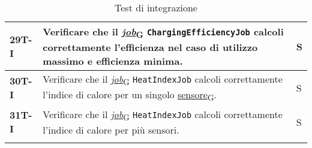 \begin{longtable}{|>{\raggedright\arraybackslash}m{}|>{\raggedright\arraybackslash}m{}|>{\raggedright\arraybackslash}m{}|}
	\hline
	\textbf{29T-I}  & Verificare che il \href{https://7last.github.io/docs/pb/documentazione-interna/glossario\#job}{\textit{job}\textsubscript{G}} \texttt{ChargingEfficiencyJob} calcoli correttamente l'efficienza nel caso di utilizzo massimo e efficienza minima.                                                                                                                                                                                  & S              \\
	\hline
	\textbf{30T-I}  & Verificare che il \href{https://7last.github.io/docs/pb/documentazione-interna/glossario\#job}{\textit{job}\textsubscript{G}} \texttt{HeatIndexJob} calcoli correttamente l'indice di calore per un singolo \href{https://7last.github.io/docs/pb/documentazione-interna/glossario\#sensore}{sensore\textsubscript{G}}.                                                                                                                                                                                                               & S              \\
	\hline
	\textbf{31T-I}  & Verificare che il \href{https://7last.github.io/docs/pb/documentazione-interna/glossario\#job}{\textit{job}\textsubscript{G}} \texttt{HeatIndexJob} calcoli correttamente l'indice di calore per più sensori.                                                                                                                                                                                                                      & S              \\
	\hline
	\caption{Test di integrazione}
\end{longtable}

\newpage
